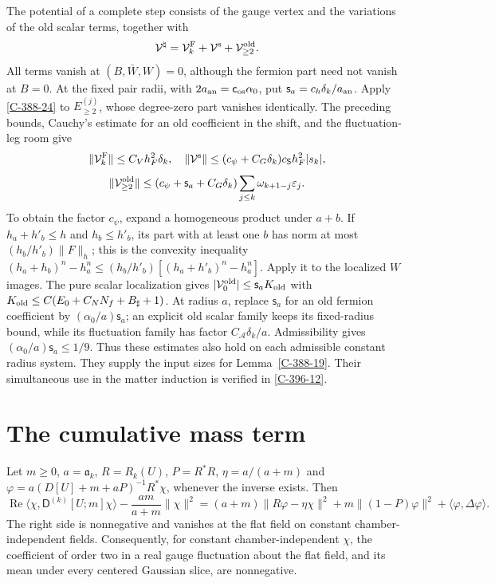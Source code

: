 \documentclass[11pt,letterpaper,reqno]{amsart}
\makeatletter
\theoremstyle{definition}
\newcommand{\ms@minorstart}{%
  \pushQED{\qed}\renewcommand{\qedsymbol}{$\blacksquare$}}
\newenvironment{lemma}[1][]{\ms@minorstart\ms@lemma[#1]}
  {\popQED\endms@lemma}
\theoremstyle{remark}
\makeatother
\begin{document}
The potential of a complete step consists of the gauge vertex
and the variations of the old scalar terms, together with
\[
 \mathcal V^{\natural}=\mathcal V_k^{\rm F}
       +\mathcal V^{\rm s}+\mathcal V^{\rm old}_{\ge2}.
\]
All terms vanish at $(B,\bar W,W)=0$, although the fermion
part need not vanish at $B=0$.  At the fixed pair radii,
with $2a_{\rm an}=\mathsf c_{\rm os}\alpha_0$, put
$\mathsf s_a=c_h\delta_k/a_{\rm an}$. Apply \cref{C-388-24}
to $E_{\ge2}^{(j)}$, whose degree-zero part vanishes identically.
The preceding bounds, Cauchy's estimate for an old coefficient in
the shift, and
the fluctuation-leg room give
\[
 \|\mathcal V_k^{\rm F}\|\le C_Vh_F^2\delta_k,
 \quad \|\mathcal V^{\rm s}\|
       \le(c_\psi+C_G\delta_k)c_{\mathsf S}h_F^2|s_k|,
\]
\[
 \|\mathcal V^{\rm old}_{\ge2}\|
 \le(c_\psi+\mathsf s_a+C_G\delta_k)
                         \sum_{j\le k}\omega_{k+1-j}\varepsilon_j.
\]
To obtain the factor $c_\psi$, expand a homogeneous product
under $a+b$.  If $h_a+h'_b\le h$ and $h_b\le h'_b$, its part
with at least one $b$ has norm at most $(h_b/h'_b)\|F\|_h$;
this is the convexity inequality
$(h_a+h_b)^n-h_a^n\le(h_b/h'_b)
[(h_a+h'_b)^n-h_a^n]$.  Apply it to the localized $W$ images.
The pure scalar localization gives
$|\mathcal V^{\rm old}_0|\le\mathsf s_aK_{\rm old}$ with
$K_{\rm old}\le C(E_0+C_NN_f+B_\sharp+1)$.
At radius $a$, replace $\mathsf s_a$ for an old fermion
coefficient by $(\alpha_0/a)\mathsf s_a$; an explicit old
scalar family keeps its fixed-radius bound, while its
fluctuation family has factor $C_{\mathcal A}\delta_k/a$.
Admissibility gives $(\alpha_0/a)\mathsf s_a\le1/9$.
Thus these estimates also hold on each admissible constant
radius system.  They supply the input sizes for
Lemma~\ref{C-388-19}. Their simultaneous use in the matter
induction is verified in \cref{C-396-12}.

\section{The cumulative mass term}

\begin{lemma}[The three-square identity]\label{C-398-4}
Let $m\ge0$, $a=\mathfrak a_k$, $R=R_k(U)$, $P=R^*R$,
$\eta=a/(a+m)$ and
$\varphi=a(D[U]+m+aP)^{-1}R^*\chi$, whenever the inverse exists.
Then
\[
 \operatorname{Re}\langle\chi,\mathsf D^{(k)}[U;m]\chi\rangle
 -\frac{am}{a+m}\|\chi\|^2
 =(a+m)\|R\varphi-\eta\chi\|^2+
     m\|(1-P)\varphi\|^2+\langle\varphi,\Delta\varphi\rangle.
\]
The right side is nonnegative and vanishes at the flat field on
constant chamber-independent fields. Consequently, for constant
chamber-independent $\chi$, the coefficient of order two in a
real gauge fluctuation about the flat field, and its mean under
every centered Gaussian slice, are nonnegative.
\end{lemma}
\end{document}
